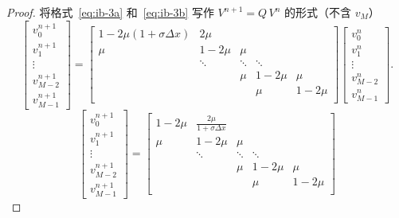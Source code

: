 \begin{proof}
    将格式~\eqref{eq:ib-3a} 和~\eqref{eq:ib-3b} 写作 $V^{n+1} = Q\, V^n$ 的形式（不含 $v_{M}$）
    \[
        \begin{bmatrix}
            v_0^{n+1} \\ v_1^{n+1} \\ \vdots \\ v_{M-2}^{n+1} \\ v_{M-1}^{n+1}
        \end{bmatrix}
        =
        \begin{bmatrix}
            1-2\mu(1+\sigma \Delta x) & 2\mu   &        &        &        \\
            \mu                       & 1-2\mu & \mu    &        &        \\
                                      & \ddots & \ddots & \ddots &        \\
                                      &        & \mu    & 1-2\mu & \mu    \\
                                      &        &        & \mu    & 1-2\mu \\
        \end{bmatrix}
        \begin{bmatrix}
            v_0^{n} \\ v_1^{n} \\ \vdots \\ v_{M-2}^{n} \\ v_{M-1}^{n}
        \end{bmatrix}.
    \]
    \[
        \begin{bmatrix}
            v_0^{n+1} \\ v_1^{n+1} \\ \vdots \\ v_{M-2}^{n+1} \\ v_{M-1}^{n+1}
        \end{bmatrix}
        =
        \begin{bmatrix}
            1-2\mu & \frac{2\mu}{1+\sigma \Delta x} &        &        &        \\
            \mu    & 1-2\mu                         & \mu    &        &        \\
                   & \ddots                         & \ddots & \ddots &        \\
                   &                                & \mu    & 1-2\mu & \mu    \\
                   &                                &        & \mu    & 1-2\mu \\

\end{bmatrix}\]
\end{proof}
